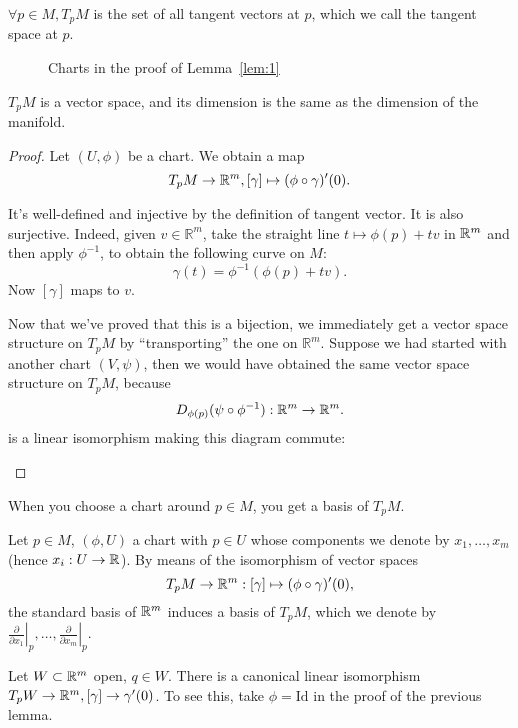 \begin{definition}
    $\forall p \in  M, T_p M$ is the set of all tangent vectors at $p$, which we call the tangent space at $p$.
\end{definition}

\begin{figure}[H]
    \centering
    \caption{Charts in the proof of Lemma~\ref{lem:1}}
    \label{fig:tangent-vector-definition-chart-independent}
\end{figure}

\begin{prop}\label{prop:tangspace}
    $T_pM$ is a vector space, and its dimension is the same as the dimension of the manifold.
\end{prop}
\begin{proof}
    Let $(U, \phi)$ be a chart. We obtain a map \[T_pM \to \mathbb{R}^m, [\gamma] \mapsto (\phi  \circ  \gamma)'(0).\]

    It's well-defined and injective by the definition of tangent vector. It is also surjective. Indeed, given $v\in \mathbb{R}^m$,  take the straight line $t \mapsto  \phi(p) + tv$ in $\mathbb{R}^m$  and then apply  $\phi^{-1}$, to obtain the following   curve on $M$: 
    \[
        \gamma(t) = \phi^{-1}(\phi(p) + tv)
    .\] 
 Now  $[\gamma]$ maps to $v$.

    Now that we've proved that this is a bijection, we immediately get a vector space structure on $T_pM$ by ``transporting'' the one on $\mathbb{R}^m$. 
    Suppose we had started with another chart $(V, \psi)$, then we would have obtained the  same vector space structure on $T_pM$, because
     \[
         D_{\phi(p)}(\psi  \circ \phi^{-1}): \mathbb{R}^m \to  \mathbb{R}^m
    .\] 
    is a linear isomorphism making this diagram commute:
    \begin{center}
    \end{center}
\end{proof}

\filbreak
When you choose a chart around $p\in M$, you get a basis of $T_pM$.
\begin{definition}
    Let $p \in M$, $(\phi, U)$ a chart with $p \in U$ whose components we denote by $x_1, \ldots, x_m$ (hence $x_i: U \to  \mathbb{R}$). 
    By means of the isomorphism of vector spaces  \[
    T_pM \to  \mathbb{R}^m: [\gamma] \mapsto  (\phi  \circ \gamma)'(0),\]
    the standard basis of $\mathbb{R}^m$ induces a basis of $T_pM$, which we denote by  $\left.\frac{\partial }{\partial x_1} \right|_p,\dots,\left.\frac{\partial }{\partial x_m} \right|_p$.
\end{definition}

\begin{remark}
    Let $W \subset \mathbb{R}^m$ open, $q \in W$.
    There is a canonical linear isomorphism $T_p W \to \mathbb{R}^{m}, [\gamma] \to \gamma'(0)$. To see this, take $\phi = \text{Id}$ in the proof of the previous lemma.
\end{remark}
